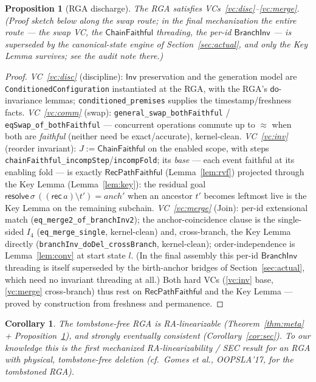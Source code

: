 \documentclass[11pt]{article}
\newtheorem{proposition}[theorem]{Proposition}
\newtheorem{corollary}[theorem]{Corollary}
\newcommand{\lean}[1]{\texttt{#1}}
\newcommand{\st}{\sigma}
\newcommand{\dodo}{\mathsf{do}}
\newcommand{\resolve}{\mathsf{resolve}}
\newcommand{\recList}{\mathsf{rec}}
\newcommand{\eqobs}{\approx}
\newcommand{\Inv}{\mathsf{Inv}}
\newcommand{\RVF}{\textsf{RecPathFaithful}}
\newcommand{\ChainFaithful}{\textsf{ChainFaithful}}
\begin{document}
\begin{proposition}[RGA discharge]\label{prop:discharge}
The RGA satisfies VCs~\ref{vc:disc}--\ref{vc:merge}. (Proof sketch below along the swap route; in the final
mechanization the \emph{entire} route --- the swap VC, the $\ChainFaithful$ threading, the
per-id $\mathsf{BranchInv}$ --- is superseded by the canonical-state engine of
Section~\ref{sec:actual}, and only the Key Lemma survives; see the audit note there.)
\end{proposition}
\begin{proof}
\emph{VC~\ref{vc:disc}} (discipline): $\Inv$ preservation and the generation model are
\lean{ConditionedConfiguration} instantiated at the RGA, with the RGA's $\dodo$-invariance
lemmas; \lean{conditioned\_premises} supplies the timestamp/freshness facts.
\emph{VC~\ref{vc:comm}} (swap): \lean{general\_swap\_bothFaithful} /
\lean{eqSwap\_of\_bothFaithful} --- concurrent operations commute up to $\eqobs$ when both
are \emph{faithful} (neither need be exact/accurate), kernel-clean.
\emph{VC~\ref{vc:inv}} (reorder invariant): $J := \ChainFaithful$ on the enabled scope, with
steps \lean{chainFaithful\_incompStep}/\lean{incompFold}; its \emph{base} --- each event
faithful at its enabling fold --- is exactly $\RVF$ (Lemma~\ref{lem:rvf}) projected through
the Key Lemma (Lemma~\ref{lem:key}): the residual goal
$\resolve\,\st\,((\recList\,a)\setminus t') = anch'$ when an ancestor $t'$ becomes leftmost
live is the Key Lemma on the remaining subchain.
\emph{VC~\ref{vc:merge}} (Join): per-id extensional match
(\lean{eq\_merge2\_of\_branchInv2}); the anchor-coincidence clause is the single-sided
$I_4$ (\lean{eq\_merge\_single}, kernel-clean) and, cross-branch, the Key Lemma directly
(\lean{branchInv\_doDel\_crossBranch}, kernel-clean); order-independence is Lemma~\ref{lem:conv}
at start state $l$. (In the final assembly this per-id $\mathsf{BranchInv}$ threading is
itself superseded by the birth-anchor bridges of Section~\ref{sec:actual}, which need no
invariant threading at all.)
Both hard VCs (\ref{vc:inv} base, \ref{vc:merge} cross-branch) thus rest on $\RVF$ and the
Key Lemma --- proved by construction from freshness and permanence.
\end{proof}

\begin{corollary}
The tombstone-free RGA is RA-linearizable (Theorem~\ref{thm:meta} + Proposition~\ref{prop:discharge}),
and strongly eventually consistent (Corollary~\ref{cor:sec}). To our knowledge this is the
first mechanized RA-linearizability / SEC result for an RGA with physical, tombstone-free
deletion (cf.\ Gomes et al., OOPSLA'17, for the tombstoned RGA).
\end{corollary}
\end{document}
